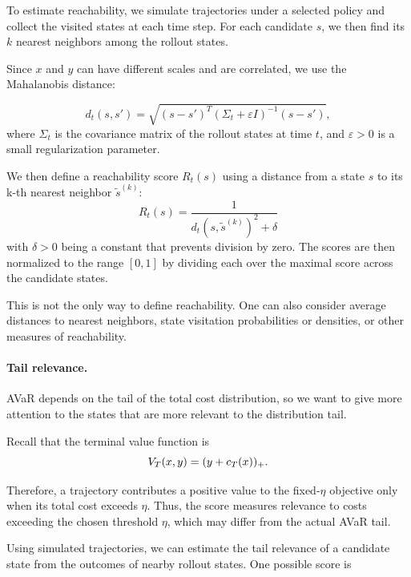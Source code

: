 To estimate reachability, we simulate trajectories under a selected policy and collect the visited states at each time step. For each candidate $s$, we then find its $k$ nearest neighbors among the rollout states.

Since $x$ and $y$ can have different scales and are correlated, we use the Mahalanobis distance:

\begin{equation}
	d_t(s,s')
	=
	\sqrt{
		(s-s')^T
		(\Sigma_t+\varepsilon I)^{-1}
		(s-s')
	},
	\label{mahalanobis-distance}
\end{equation}
where $\Sigma_t$ is the covariance matrix of the rollout states at time $t$, and $\varepsilon>0$ is a small regularization parameter.

We then define a reachability score $R_t(s)$ using a distance from a state $s$ to its k-th nearest neighbor $\tilde{s}^{(k)}$:
\begin{equation}
	R_t(s) = \frac{1}{d_t(s, \tilde{s}^{(k)})^2 + \delta}
	\label{reachability-score}
\end{equation}
with $\delta > 0$ being a constant that prevents division by zero. The scores are then normalized to the range $[0, 1]$ by dividing each over the maximal score across the candidate states.

This is not the only way to define reachability. One can also consider average distances to nearest neighbors, state visitation probabilities or densities, or other measures of reachability.

\paragraph{Tail relevance.}

AVaR depends on the tail of the total cost distribution, so we want to give more attention to the states that are more relevant to the distribution tail.

Recall that the terminal value function is
\begin{equation}
	V_T(x,y)=(y+c_T(x))_+.
	\notag
\end{equation}

Therefore, a trajectory contributes a positive value to the fixed-$\eta$ objective only when its total cost exceeds $\eta$. Thus, the score measures relevance to costs exceeding the chosen threshold $\eta$, which may differ from the actual AVaR tail.

Using simulated trajectories, we can estimate the tail relevance of a candidate state from the outcomes of nearby rollout states. One possible score is

